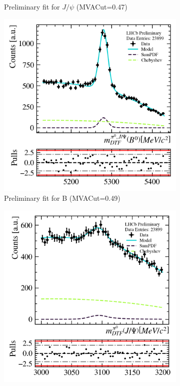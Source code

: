 \begin{figure}
\begin{subfigure}{0.49\textwidth}
        \caption*{Preliminary fit for $J/\psi$ (MVACut=0.47)}
        \label{fig:prefit_mvascan_mvacut040_b}
    \end{subfigure}
    \begin{subfigure}{0.49\textwidth}
        \includegraphics[width=\textwidth]{./OutputFiles/PNGPlots/PreliminaryFit/MVAScan/b1dfit_mva0.49_jpsichannel.png}
        \caption*{Preliminary fit for B (MVACut=0.49)}
        \label{fig:prefit_mvascan_mvacut040_b}
    \end{subfigure}
    \begin{subfigure}{0.49\textwidth}
        \includegraphics[width=\textwidth]{./OutputFiles/PNGPlots/PreliminaryFit/MVAScan/jpsi1dfit_mva0.49_jpsichannel.png}

\end{subfigure}
\end{figure}
